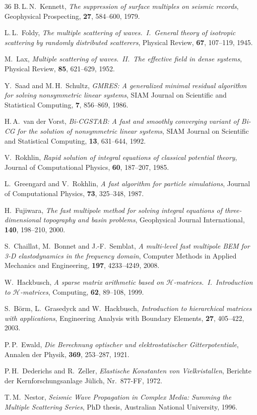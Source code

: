 \begin{thebibliography}{36}
B.\,L.\,N.~Kennett,
\textit{The suppression of surface multiples on seismic records},
Geophysical Prospecting, \textbf{27}, 584--600, 1979.

L.\,L.~Foldy,
\textit{The multiple scattering of waves.\ I.\ General theory of isotropic
scattering by randomly distributed scatterers},
Physical Review, \textbf{67}, 107--119, 1945.

M.~Lax,
\textit{Multiple scattering of waves.\ II.\ The effective field in dense
systems},
Physical Review, \textbf{85}, 621--629, 1952.

Y.~Saad and M.\,H.~Schultz,
\textit{GMRES: A generalized minimal residual algorithm for solving
nonsymmetric linear systems},
SIAM Journal on Scientific and Statistical Computing, \textbf{7}, 856--869, 1986.

H.\,A.~van der Vorst,
\textit{Bi-CGSTAB: A fast and smoothly converging variant of Bi-CG for the
solution of nonsymmetric linear systems},
SIAM Journal on Scientific and Statistical Computing, \textbf{13}, 631--644, 1992.

V.~Rokhlin,
\textit{Rapid solution of integral equations of classical potential theory},
Journal of Computational Physics, \textbf{60}, 187--207, 1985.

L.~Greengard and V.~Rokhlin,
\textit{A fast algorithm for particle simulations},
Journal of Computational Physics, \textbf{73}, 325--348, 1987.

H.~Fujiwara,
\textit{The fast multipole method for solving integral equations of
three-dimensional topography and basin problems},
Geophysical Journal International, \textbf{140}, 198--210, 2000.

S.~Chaillat, M.~Bonnet and J.-F.~Semblat,
\textit{A multi-level fast multipole BEM for 3-D elastodynamics in the
frequency domain},
Computer Methods in Applied Mechanics and Engineering, \textbf{197},
4233--4249, 2008.

W.~Hackbusch,
\textit{A sparse matrix arithmetic based on $\mathcal{H}$-matrices.\ I.\
Introduction to $\mathcal{H}$-matrices},
Computing, \textbf{62}, 89--108, 1999.

S.~B\"orm, L.~Grasedyck and W.~Hackbusch,
\textit{Introduction to hierarchical matrices with applications},
Engineering Analysis with Boundary Elements, \textbf{27}, 405--422, 2003.

P.\,P.~Ewald,
\textit{Die Berechnung optischer und elektrostatischer Gitterpotentiale},
Annalen der Physik, \textbf{369}, 253--287, 1921.

P.\,H.~Dederichs and R.~Zeller,
\textit{Elastische Konstanten von Vielkristallen},
Berichte der Kernforschungsanlage J\"ulich, Nr.\ 877-FF, 1972.

T.\,M.~Nestor,
\textit{Seismic Wave Propagation in Complex Media: Summing the Multiple
Scattering Series},
PhD thesis, Australian National University, 1996.

\end{thebibliography}
